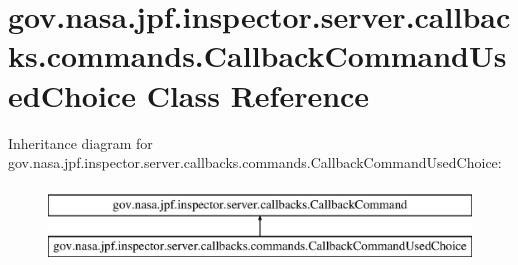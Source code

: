 \hypertarget{classgov_1_1nasa_1_1jpf_1_1inspector_1_1server_1_1callbacks_1_1commands_1_1_callback_command_used_choice}{}\section{gov.\+nasa.\+jpf.\+inspector.\+server.\+callbacks.\+commands.\+Callback\+Command\+Used\+Choice Class Reference}
\label{classgov_1_1nasa_1_1jpf_1_1inspector_1_1server_1_1callbacks_1_1commands_1_1_callback_command_used_choice}
Inheritance diagram for gov.\+nasa.\+jpf.\+inspector.\+server.\+callbacks.\+commands.\+Callback\+Command\+Used\+Choice\+:\begin{figure}[H]
\begin{center}
\leavevmode
\includegraphics[height=2.000000cm]{classgov_1_1nasa_1_1jpf_1_1inspector_1_1server_1_1callbacks_1_1commands_1_1_callback_command_used_choice}
\end{center}
\end{figure}
